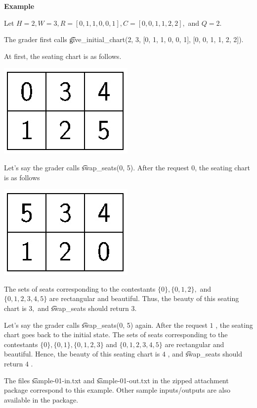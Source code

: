 \bf{Example}

Let $ H=2, W=3, R=[0,1,1,0,0,1], C=[0,0,1,1,2,2], $ and $ Q=2. $ 

The grader first calls \t{give_initial_chart(2, 3, [0, 1, 1, 0, 0, 1], [0, 0, 1, 1, 2, 2]).} 

At first, the seating chart is as follows.

\includegraphics{image-000.jpg}

Let's say the grader calls \t{swap_seats(0, 5).} After the request 0, the seating chart is as follows

\includegraphics{image-001.jpg}

The sets of seats corresponding to the contestants $ \{0\}, \{0,1,2\}, $ and $ \{0,1,2,3,4,5\} $ are rectangular and beautiful. Thus, the beauty of this seating chart is $ 3, $ and \t{swap_seats} should return $ 3. $ 

Let's say the grader calls \t{swap_seats(}0, 5) again. After the request $ 1 $ , the seating chart goes back to the initial state. The sets of seats corresponding to the contestants $ \{0\}, \{0,1\}, \{0,1,2,3\} $ and $ \{0,1,2,3,4,5\} $ are rectangular and beautiful. Hence, the beauty of this seating chart is $ 4 $ , and \t{swap_seats }should return $ 4 $ .

The files \t{sample-01-in.txt} and \t{sample-01-out.txt} in the zipped attachment package correspond to this example. Other sample inputs/outputs are also available in the package.
